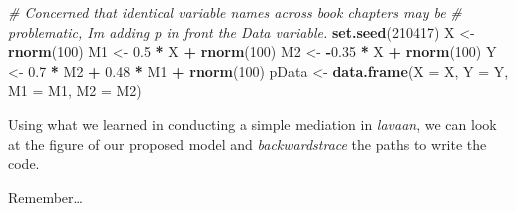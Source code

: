 \documentclass[
  11pt,
]{book}
\newenvironment{Shaded}{\begin{snugshade}}{\end{snugshade}}
\newcommand{\AttributeTok}[1]{\textcolor[rgb]{0.27,0.27,0.27}{#1}}
\newcommand{\CommentTok}[1]{\textcolor[rgb]{0.37,0.37,0.37}{\textit{#1}}}
\newcommand{\DecValTok}[1]{\textcolor[rgb]{0.06,0.06,0.06}{#1}}
\newcommand{\FloatTok}[1]{\textcolor[rgb]{0.06,0.06,0.06}{#1}}
\newcommand{\FunctionTok}[1]{\textcolor[rgb]{0.27,0.27,0.27}{\textbf{#1}}}
\newcommand{\NormalTok}[1]{#1}
\newcommand{\OtherTok}[1]{\textcolor[rgb]{0.37,0.37,0.37}{#1}}
\newcommand{\SpecialCharTok}[1]{\textcolor[rgb]{0.43,0.43,0.43}{\textbf{#1}}}
\begin{document}
\begin{Shaded}
\begin{Highlighting}[]
\CommentTok{\# Concerned that identical variable names across book chapters may be}
\CommentTok{\# problematic, I\textquotesingle{}m adding \textquotesingle{}p\textquotesingle{} in front the \textquotesingle{}Data\textquotesingle{} variable.}
\FunctionTok{set.seed}\NormalTok{(}\DecValTok{210417}\NormalTok{)}
\NormalTok{X }\OtherTok{\textless{}{-}} \FunctionTok{rnorm}\NormalTok{(}\DecValTok{100}\NormalTok{)}
\NormalTok{M1 }\OtherTok{\textless{}{-}} \FloatTok{0.5} \SpecialCharTok{*}\NormalTok{ X }\SpecialCharTok{+} \FunctionTok{rnorm}\NormalTok{(}\DecValTok{100}\NormalTok{)}
\NormalTok{M2 }\OtherTok{\textless{}{-}} \SpecialCharTok{{-}}\FloatTok{0.35} \SpecialCharTok{*}\NormalTok{ X }\SpecialCharTok{+} \FunctionTok{rnorm}\NormalTok{(}\DecValTok{100}\NormalTok{)}
\NormalTok{Y }\OtherTok{\textless{}{-}} \FloatTok{0.7} \SpecialCharTok{*}\NormalTok{ M2 }\SpecialCharTok{+} \FloatTok{0.48} \SpecialCharTok{*}\NormalTok{ M1 }\SpecialCharTok{+} \FunctionTok{rnorm}\NormalTok{(}\DecValTok{100}\NormalTok{)}
\NormalTok{pData }\OtherTok{\textless{}{-}} \FunctionTok{data.frame}\NormalTok{(}\AttributeTok{X =}\NormalTok{ X, }\AttributeTok{Y =}\NormalTok{ Y, }\AttributeTok{M1 =}\NormalTok{ M1, }\AttributeTok{M2 =}\NormalTok{ M2)}
\end{Highlighting}
\end{Shaded}

Using what we learned in conducting a simple mediation in \emph{lavaan}, we can look at the figure of our proposed model and \emph{backwardstrace} the paths to write the code.

Remember\ldots{}
\end{document}
